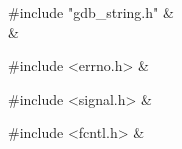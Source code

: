 \medskip
\begin{cxreftabi}
{\stt \#include "gdb\_string.h"} &\\
\hspace*{0.2in}{\stt \#include <string.h>} &\\
\end{cxreftabi}

\medskip
\begin{cxreftabi}
{\stt \#include <errno.h>} &\\
\end{cxreftabi}

\medskip
\begin{cxreftabi}
{\stt \#include <signal.h>} &\\
\end{cxreftabi}

\medskip
\begin{cxreftabi}
{\stt \#include <fcntl.h>} &\\
\end{cxreftabi}

